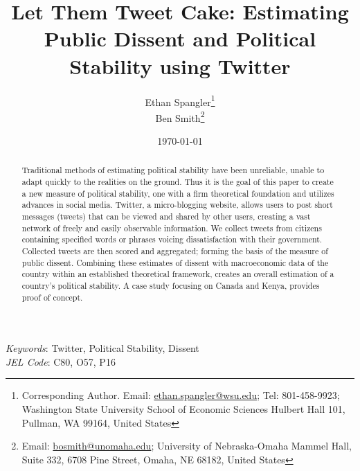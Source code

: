 \documentclass[12pt]{article}
\begin{document}
  


\begin{titlepage}




\title{Let Them Tweet Cake: Estimating Public Dissent and Political Stability using Twitter}



\author{Ethan Spangler\thanks{Corresponding Author. Email: {\href{mailto:ethan.spangler@wsu.edu}{ethan.spangler@wsu.edu}}; Tel: 801-458-9923; Washington State University School of Economic Sciences Hulbert Hall 101, Pullman, WA 99164, United States}  \\
Ben Smith\thanks{Email: {\href{mailto:bosmith@unomaha.edu}{bosmith@unomaha.edu}}; University of Nebraska-Omaha Mammel Hall, Suite 332, 6708 Pine Street, Omaha, NE 68182, United States}}



\date{\today}

\maketitle

\begin{abstract}
\noindent Traditional methods of estimating political stability have been unreliable, unable to adapt quickly to the realities on the ground. Thus it is the goal of this paper to create a new measure of political stability, one with a firm theoretical foundation and utilizes advances in social media. Twitter, a micro-blogging website, allows users to post short messages (tweets) that can be viewed and shared by other users, creating a vast network of freely and easily observable information. We collect tweets from citizens containing specified words or phrases voicing dissatisfaction with their government. Collected tweets are then scored and aggregated; forming the basis of the measure of public dissent. Combining these estimates of dissent with macroeconomic data of the country within an established theoretical framework, creates an overall estimation of a country's political stability. A case study focusing on Canada and Kenya, provides proof of concept.
\end{abstract}

\noindent \textit{Keywords}: Twitter, Political Stability, Dissent \\

\noindent \textit{JEL Code}: C80, O57, P16




\end{titlepage}
\end{document}
